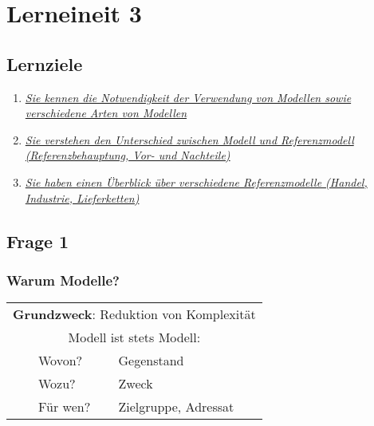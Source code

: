 \documentclass[a4paper]{article}
\newcommand{\tabitem}{~~\llap{\textbullet}~~}
\begin{document}
\pagebreak %

\section*{Lerneineit 3}
\subsection*{Lernziele}
\begin{enumerate}
	\item \hyperref[le3-1]{\textit{Sie kennen die Notwendigkeit der Verwendung von Modellen sowie verschiedene Arten von Modellen}}
	\item \hyperref[le3-2]{\textit{Sie verstehen den Unterschied zwischen Modell und Referenzmodell (Referenzbehauptung, Vor- und Nachteile)}}
	\item \hyperref[le3-3]{\textit{Sie haben einen Überblick über verschiedene Referenzmodelle (Handel, Industrie, Lieferketten)}}
\end{enumerate}

\subsection*{Frage 1}
\label{le3-1}
\subsubsection*{Warum Modelle?}
%
\centering
	\begin{tabular}{ll}
		\toprule
			\multicolumn{2}{c}{\textbf{Grundzweck}: Reduktion von Komplexität} \\[.5\normalbaselineskip]
		\multicolumn{2}{c}{Modell ist stets Modell:} \\
		\midrule
		\tabitem Wovon? & Gegenstand \\
		\tabitem Wozu? & Zweck \\
		\tabitem Für wen? & Zielgruppe, Adressat \\
		\bottomrule
	\end{tabular}
\\[1\normalbaselineskip]
\end{document}
